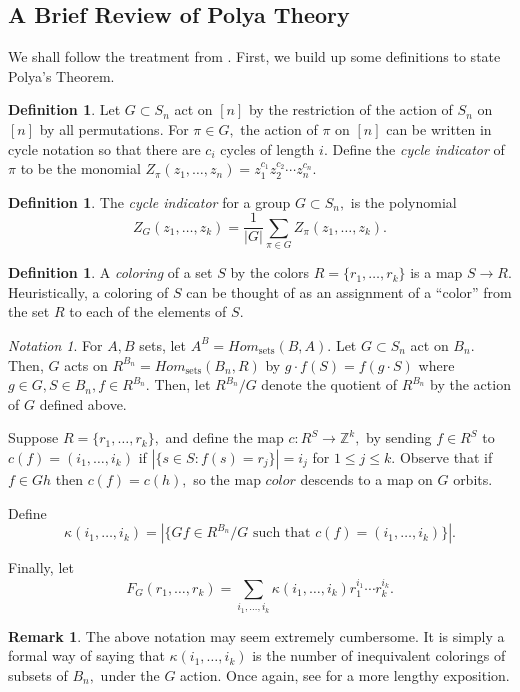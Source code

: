 \documentclass[10 pt]{amsart}
\theoremstyle{plain}
\theoremstyle{definition}
\newtheorem{defn}[thm]{Definition}
\newtheorem{rem}[thm]{Remark}
\theoremstyle{remark}
\newtheorem{note}[thm]{Notation}
\numberwithin{equation}{section}
\newcommand\ssec{\subsection}
\newcommand\BBZ{{\mathbb Z}}
\begin{document}
\ssec{A Brief Review of Polya Theory}

We shall follow the treatment from \cite[Chapter 7]{algebraic_stanley}. First, we build up some definitions to state Polya's Theorem.

\begin{defn}
Let $G \subset S_n$ act on $[n]$ by the restriction of the action of $S_n$ on $[n]$ by all permutations. For $\pi \in G,$ the action of $\pi$ on $[n]$ can be written in cycle notation so that there are $c_i$ cycles of length $i.$ Define the {\it cycle indicator} of $\pi$ to be the monomial $Z_\pi(z_1,\ldots, z_n) = z_1^{c_1}z_2^{c_2}\cdots z_n^{c_n}.$
\end{defn}

\begin{defn}
The {\it cycle indicator} for a group $G \subset S_n,$ is the polynomial $$Z_G(z_1,\ldots, z_k) = \frac{1}{|G|}\sum_{\pi \in G} Z_\pi(z_1,\ldots, z_k).$$
\end{defn}

\begin{defn}
A {\it coloring} of a set $S$ by the colors $R = \{r_1,\ldots, r_k\}$ is a map $S \rightarrow R.$ Heuristically, a coloring of $S$ can be thought of as an assignment of a ``color'' from the set $R$ to each of the elements of $S.$
\end{defn}

\begin{note}
For $A,B$ sets, let $A^B = Hom_{\text{sets}}(B,A).$ Let $G \subset S_n$ act on $B_n.$ Then, $G$ acts on $R^{B_n} = Hom_{\text{sets}}(B_n,R)$ by $g \cdot f(S) = f(g\cdot S)$ where $g \in G,S \in B_n, f \in R^{B_n}.$ Then, let $R^{B_n}/G$ denote the quotient of $R^{B_n}$ by the action of $G$ defined above.

Suppose $R = \{r_1,\ldots, r_k\},$ and define the map $c:R^{S}\rightarrow \BBZ^k,$ by sending $f \in R^S$ to $c(f) = (i_1,\ldots, i_k)$ if $|\{s \in S\colon f(s) = r_j\}| = i_j$ for $1 \leq j \leq k.$ Observe that if $f \in Gh$ then $c(f) = c(h),$ so the map $color$ descends to a map on $G$ orbits.

Define $$\kappa(i_1,\ldots, i_k) = |\{Gf \in R^{B_n}/G \text{ such that } c(f) = (i_1,\ldots, i_k) \}|.$$

Finally, let 
$$F_G(r_1,\ldots, r_k) = \sum_{i_1,\ldots, i_k} \kappa(i_1,\ldots, i_k)r_1^{i_1} \cdots r_k^{i_k}.$$
\end{note}

\begin{rem}
The above notation may seem extremely cumbersome. It is simply a formal way of saying that $\kappa(i_1,\ldots, i_k)$ is the number of inequivalent colorings of subsets of $B_n,$ under the $G$ action. Once again, see \cite[Chapter 7]{algebraic_stanley} for a more lengthy exposition.
\end{rem}
\end{document}
